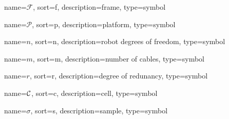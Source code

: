 	{%
		name=\ensuremath{\mathscr{F}},
		sort=f,
		description=frame,
		type=symbol
	}
	\newcommand{\framesym}{\gls{sym:frame}}

	{%
		name=\ensuremath{\mathscr{P}},
		sort=p,
		description=platform,
		type=symbol
	}
	\newcommand{\platform}{\gls{sym:platform}}
	\newcommand{\platformframe}{\framesym_{\platform}}
	\newcommand{\worldframe}{\framesym_{\world}} %

	{%
		name=\ensuremath{n},
		sort=n,
		description=robot degrees of freedom,
		type=symbol
	}
	\newcommand{\robotdof}{\gls{sym:robotdof}}

	{%
		name=\ensuremath{m},
		sort=m,
		description=number of cables,
		type=symbol
	}
	\newcommand{\numcables}{\gls{sym:numcables}}

	{%
		name=\ensuremath{r},
		sort=r,
		description=degree of redunancy,
		type=symbol
	}
	\newcommand{\degofredundancy}{\gls{sym:degofredundancy}}

	{%
		name=\ensuremath{\set{C}},
		sort=c,
		description=cell,
		type=symbol
	}
	\newcommand{\cell}{\gls{sym:cell}}

	{%
		name=\ensuremath{\sigma},
		sort=s,
		description=sample,
		type=symbol
	}
	\newcommand{\sample}{\gls{sym:sample}}

